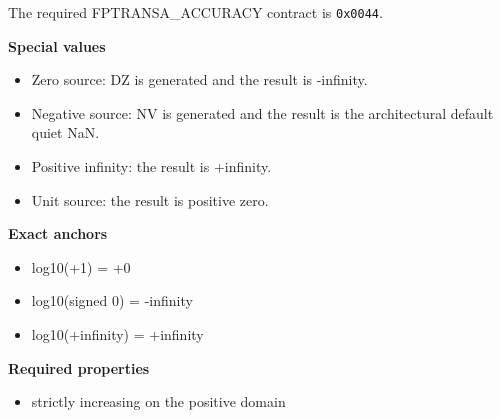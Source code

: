 The required FPTRANSA\_ACCURACY contract is \texttt{0x0044}.

\textbf{Special values}\par
\begin{itemize}
\item Zero source: DZ is generated and the result is -infinity.
\item Negative source: NV is generated and the result is the architectural default quiet NaN.
\item Positive infinity: the result is +infinity.
\item Unit source: the result is positive zero.
\end{itemize}

\textbf{Exact anchors}\par
\begin{itemize}
\item log10(+1) = +0
\item log10(signed 0) = -infinity
\item log10(+infinity) = +infinity
\end{itemize}

\textbf{Required properties}\par
\begin{itemize}
\item strictly increasing on the positive domain
\end{itemize}
